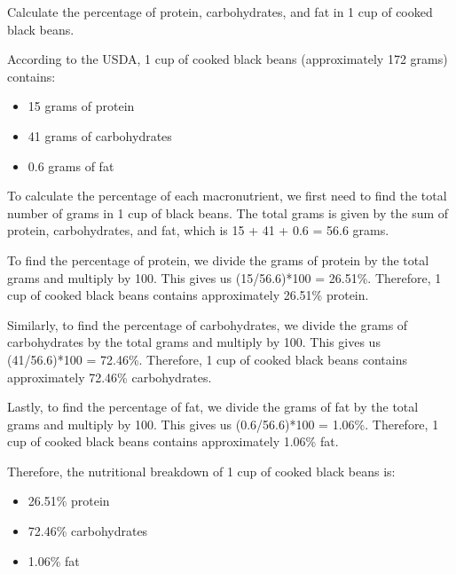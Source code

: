 \question Calculate the percentage of protein, carbohydrates, and fat in 1 cup of cooked black beans.
\begin{solution}
According to the USDA, 1 cup of cooked black beans (approximately 172 grams) contains: 
\begin{itemize}
    \item 15 grams of protein
    \item 41 grams of carbohydrates
    \item 0.6 grams of fat 
\end{itemize}

To calculate the percentage of each macronutrient, we first need to find the total number of grams in 1 cup of black beans. The total grams is given by the sum of protein, carbohydrates, and fat, which is 15 + 41 + 0.6 = 56.6 grams. 

To find the percentage of protein, we divide the grams of protein by the total grams and multiply by 100. This gives us (15/56.6)*100 = 26.51\%. Therefore, 1 cup of cooked black beans contains approximately 26.51\% protein. 

Similarly, to find the percentage of carbohydrates, we divide the grams of carbohydrates by the total grams and multiply by 100. This gives us (41/56.6)*100 = 72.46\%. Therefore, 1 cup of cooked black beans contains approximately 72.46\% carbohydrates. 

Lastly, to find the percentage of fat, we divide the grams of fat by the total grams and multiply by 100. This gives us (0.6/56.6)*100 = 1.06\%. Therefore, 1 cup of cooked black beans contains approximately 1.06\% fat. 

Therefore, the nutritional breakdown of 1 cup of cooked black beans is:

\begin{itemize}
    \item 26.51\% protein
    \item 72.46\% carbohydrates 
    \item 1.06\% fat 
\end{itemize}
\end{solution}
